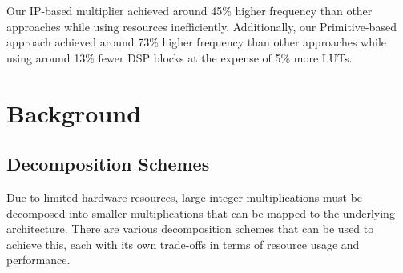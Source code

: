 \documentclass[conference]{IEEEtran}
\begin{document}
Our IP-based multiplier achieved around 45\% higher frequency than other approaches while using resources inefficiently. 
Additionally, our Primitive-based approach achieved around 73\% higher frequency than other approaches while using around 13\% fewer DSP blocks at the expense of 5\% more LUTs. 





\section{Background} \label{sec_background}

\subsection{Decomposition Schemes}
Due to limited hardware resources, large integer multiplications must be decomposed into smaller multiplications that can be mapped to the underlying architecture. 
There are various decomposition schemes that can be used to achieve this, each with its own trade-offs in terms of resource usage and performance.
\end{document}
